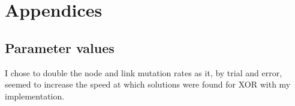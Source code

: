 \section{Appendices}

\subsection{Parameter values}
I chose to double the node and link mutation rates as it, by trial and error, seemed to increase
the speed at which solutions were found for XOR with my implementation.
\label{parameter_values}